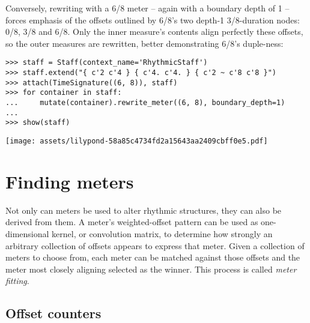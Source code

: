 \noindent Conversely, rewriting with a 6/8 meter -- again with a boundary depth
of 1 -- forces emphasis of the offsets outlined by 6/8's two depth-1
3/8-duration nodes: 0/8, 3/8 and 6/8. Only the inner measure's contents align
perfectly these offsets, so the outer measures are rewritten, better
demonstrating 6/8's duple-ness:

\begin{comment}
<abjad>
staff = Staff(context_name='RhythmicStaff')
staff.extend("{ c'2 c'4 } { c'4. c'4. } { c'2 ~ c'8 c'8 }")
attach(TimeSignature((6, 8)), staff)
for container in staff:
    mutate(container).rewrite_meter((6, 8), boundary_depth=1)

show(staff)
</abjad>
\end{comment}

\begin{singlespacing}
\vspace{-0.5\baselineskip}
\begin{lstlisting}
>>> staff = Staff(context_name='RhythmicStaff')
>>> staff.extend("{ c'2 c'4 } { c'4. c'4. } { c'2 ~ c'8 c'8 }")
>>> attach(TimeSignature((6, 8)), staff)
>>> for container in staff:
...     mutate(container).rewrite_meter((6, 8), boundary_depth=1)
...
>>> show(staff)
\end{lstlisting}
\noindent\texttt{[image: assets/lilypond-58a85c4734fd2a15643aa2409cbff0e5.pdf]}
\end{singlespacing}

\section{Finding meters}
\label{sec:finding-meters}

Not only can meters be used to alter rhythmic structures, they can also be
derived from them. A meter's weighted-offset pattern can be used as
one-dimensional kernel, or convolution matrix, to determine how strongly an
arbitrary collection of offsets appears to express that meter. Given a
collection of meters to choose from, each meter can be matched against those
offsets and the meter most closely aligning selected as the winner. This
process is called \emph{meter fitting}.

\subsection{Offset counters} %

